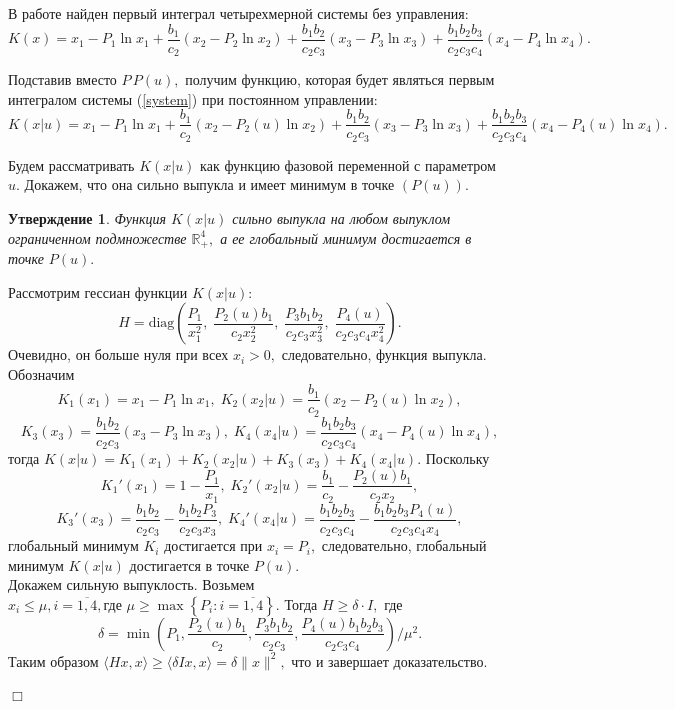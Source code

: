 \documentclass[11pt]{article}
\newtheorem{statement}{Утверждение}
\theoremstyle{definition}
\newenvironment{Proof}
{\par\noindent{\bf Доказательство.\\}} 
{\begin{flushright}$\Box$\end{flushright}}
\newcommand\Set[2]{\left\{ #1 \colon #2 \right\}}
\newcommand\Ref[1]{(\ref{#1})}
\newcommand\ftw[2]{\overline{#1,#2}}
\newcommand\RS{\Ref{system} }
\newcommand\beq{\begin{equation}}
\newcommand\eeq{\end{equation}}
\begin{document}

В работе \cite{MathBio} найден первый интеграл четырехмерной системы без управления: 
$$K(x) = x_1 - P_1\ln x_1 + \frac{b_1}{c_2}(x_2 - P_2\ln x_2) + \frac{b_1b_2}{c_2c_3}(x_3 - P_3\ln x_3) + \frac{b_1b_2b_3}{c_2c_3c_4}(x_4 - P_4\ln x_4).$$

Подставив вместо $P\, P(u),$ получим функцию, которая будет являться первым интегралом системы \RS при постоянном управлении:
\beq
	K(x|u) = x_1 - P_1\ln x_1 + \frac{b_1}{c_2}(x_2 - P_2(u)\ln x_2) + \frac{b_1b_2}{c_2c_3}(x_3 - P_3\ln x_3) + \frac{b_1b_2b_3}{c_2c_3c_4}(x_4 - P_4(u)\ln x_4).
\eeq

Будем рассматривать $K(x|u)$ как функцию фазовой переменной с параметром $u.$ Докажем, что она сильно выпукла и имеет минимум в точке $(P(u)).$

\begin{statement}
\label{compact}
	Функция $K(x|u)$ сильно выпукла на любом выпуклом ограниченном подмножестве $\mathbb{R}_+^4,$ а ее глобальный минимум достигается в точке $P(u).$
\end{statement}
\begin{Proof}
	Рассмотрим гессиан функции $K(x|u):$
	$$H = \text{diag} \left(\frac{P_1}{x_1^2}, \; \frac{P_2(u)b_1}{c_2x_2^2}, \; \frac{P_3b_1b_2}{c_2c_3x_3^2}, \; \frac{P_4(u)}{c_2c_3c_4x_4^2}\right).$$
	Очевидно, он больше нуля при всех $x_i > 0,$ следовательно, функция выпукла.\\
	Обозначим 
	$$K_1(x_1) = x_1 - P_1\ln x_1, \; K_2(x_2|u) = \frac{b_1}{c_2}(x_2 - P_2(u)\ln x_2),$$
	$$K_3(x_3) = \frac{b_1b_2}{c_2c_3}(x_3 - P_3\ln x_3), \; K_4(x_4|u) = \frac{b_1b_2b_3}{c_2c_3c_4}(x_4 - P_4(u)\ln x_4),$$ тогда $K(x|u) =  K_1(x_1) + K_2(x_2|u) + K_3(x_3) + K_4(x_4|u).$  Поскольку 
	$$K_1'(x_1) = 1 - \frac{P_1}{x_1}, \; K_2'(x_2|u) = \frac{b_1}{c_2} - \frac{P_2(u)b_1}{c_2x_2},$$
	$$K_3'(x_3) = \frac{b_1b_2}{c_2c_3} - \frac{b_1b_2P_3}{c_2c_3x_3}, \; K_4'(x_4|u) = \frac{b_1b_2b_3}{c_2c_3c_4} - \frac{b_1b_2b_3P_4(u)}{c_2c_3c_4x_4},$$ 
	глобальный минимум $K_i$ достигается при $x_i = P_i,$ следовательно, глобальный минимум $K(x|u)$ достигается в точке $P(u).$ \\
	 Докажем сильную выпуклость. Возьмем $x_i \leqslant \mu, i = \ftw{1}{4}, \text{где } \mu \geqslant \max\Set{P_i}{i = \ftw{1}{4}}.$ Тогда $H \geqslant \delta\cdot I,$ где  
	 $$\delta = \min\left(P_1, \frac{P_2(u)b_1}{c_2}, \frac{P_3b_1b_2}{c_2c_3}, \frac{P_4(u)b_1b_2b_3}{c_2c_3c_4}\right)/\mu^2.$$
	 Таким образом $\langle Hx,x \rangle \geqslant \langle \delta Ix,x \rangle = \delta \|x\|^2,$ что и завершает доказательство.
\end{Proof}
\end{document}

